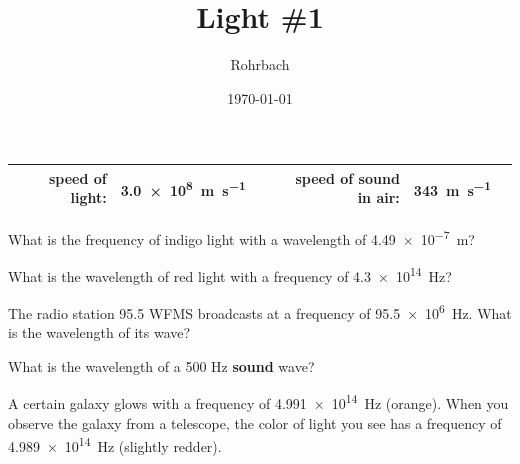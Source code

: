 \documentclass[10pt]{exam}
\title{Light \#1}
\author{Rohrbach}
\date{\today}
\begin{document}
\maketitle

\begin{center}
  \renewcommand{\arraystretch}{2}
  \begin{tabular}{|crlc|crlc|}
    \hline
     & speed of light: & \SI{3.0e8}{\meter\per\second} & &
     & speed of sound in air: & \SI{343}{\meter\per\second} &
    \\\hline
  \end{tabular}
\end{center}

\begin{questions}

\question
  What is the frequency of indigo light with a wavelength of \SI{4.49e-7}{\meter}?
  \vs

\question
  What is the wavelength of red light with a frequency of \SI{4.3e14}{\hertz}?
  \vs

\question
  The radio station 95.5 WFMS broadcasts at a frequency of \SI{95.5e6}{\hertz}.  What is the wavelength of its wave?
  \vs

\question
  What is the wavelength of a 500 Hz {\bf sound} wave?
  \vs
  
\question
  A certain galaxy glows with a frequency of \SI{4.991e14}{\hertz} (orange).  When you observe the galaxy from a telescope, the color of light you see has a frequency of \SI{4.989e14}{\hertz} (slightly redder).

  
  
  
  
  
  
  
  
  
\end{questions}
\end{document}
